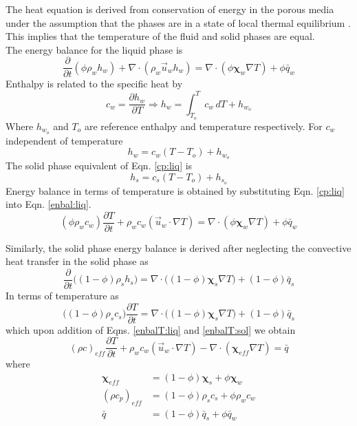 The heat equation is derived from conservation of energy in the porous media under the assumption that the phases are in a state of local thermal equilibrium \cite{lewis,vadimas,languri}. This implies that the temperature of the fluid and solid phases are equal.\\
The energy balance for the liquid phase is 
\begin{equation} \label{enbal:liq}
\frac{\partial }{\partial t}(\phi\rho_w h_w)+ \nabla\cdot(\rho_w\vec{u}_wh_w)=\nabla\cdot( \phi\mathbf{\chi}_w\nabla T)+\phi\bar{q}_w
\end{equation}
Enthalpy is related to the specific heat by
\begin{equation}
c_w=\frac{\partial h_w}{\partial T} \Rightarrow h_w=\int_{T_o}^T c_w \,dT + h_{w_o}
\end{equation}
Where $h_{w_o}$ and $T_o$ are reference enthalpy and temperature respectively. For $c_w$ independent of temperature
\begin{equation} \label{cp:liq}
h_w= c_w (T-T_o) + h_{w_o}
\end{equation}
The solid phase equivalent of Eqn. \ref{cp:liq} is
\begin{equation} \label{cp:sol}
h_s= c_s (T-T_o) + h_{s_o}
\end{equation}
%
Energy balance in terms of temperature is obtained by substituting Eqn. \ref{cp:liq} into Eqn. \ref{enbal:liq}.
\begin{equation} \label{enbalT:liq}
(\phi\rho_w c_w)\frac{\partial T }{\partial t}+ \rho_wc_w(\vec{u}_w\cdot\nabla T)=\nabla\cdot( \phi\mathbf{\chi}_w\nabla T)+\phi\bar{q}_w
\end{equation}
%

Similarly, the solid phase energy balance is derived after neglecting the convective heat transfer in the solid phase  as  
\begin{equation}\label{enbal:sol}
\frac{\partial }{\partial t}\big((1-\phi)\rho_s h_s\big)=\nabla\cdot\big((1- \phi)\mathbf{\chi}_s\nabla T\big)+(1-\phi)\bar{q}_s
\end{equation}
In terms of temperature as 
\begin{equation} \label{enbalT:sol}
\big((1-\phi)\rho_s c_s\big)\frac{\partial T}{\partial t}=\nabla\cdot\big( (1-\phi)\mathbf{\chi}_s\nabla T\big)+(1-\phi)\bar{q}_s
\end{equation}
%
which upon addition of Eqns. \ref{enbalT:liq} and \ref{enbalT:sol} we obtain
%
\begin{equation}
(\rho c )_{eff}\frac{\partial T}{\partial t} + \rho_wc_w(\vec{u}_w\cdot\nabla T)-\nabla\cdot(\mathbf{\chi}_{eff}\nabla T)=\bar{q}
\end{equation}
%
where
\begin{equation}
\begin{split}
\mathbf{\chi}_{eff} &= (1-\phi)\mathbf{\chi}_s +\phi\mathbf{\chi}_w		\\
(\rho c_p )_{eff} &= (1-\phi)\rho_s c_s +\phi\rho_w c_w			\\
\bar{q} &= (1-\phi)\bar{q}_s+\phi\bar{q}_w
\end{split}
\end{equation}
